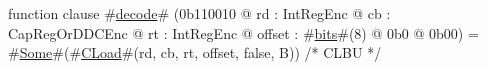 function clause #\hyperref[sailMIPSzdecode]{decode}# (0b110010 @ rd : IntRegEnc @ cb : CapRegOrDDCEnc @ rt : IntRegEnc @ offset : #\hyperref[sailMIPSzbits]{bits}#(8) @ 0b0 @ 0b00) = #\hyperref[sailMIPSzSome]{Some}#(#\hyperref[sailMIPSzCLoad]{CLoad}#(rd, cb, rt, offset, false, B)) /* CLBU */
